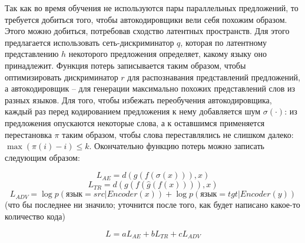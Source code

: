 \documentclass[12pt,twoside]{article}
\begin{document}
Так как во время обучения не используются пары параллельных предложений, то требуется добиться того, чтобы автокодировщики вели себя похожим образом. Этого можно добиться, потребовав сходство латентных пространств. Для этого предлагается использовать сеть-дискриминатор $q$, которая по латентному представлению $h$ некоторого предложения определяет, какому языку оно принадлежит. Функция потерь записывается таким образом, чтобы оптимизировать дискриминатор $r$ для распознавания представлений предложений, а автокодировщик -- для генерации максимально похожих представлений слов из разных языков. Для того, чтобы избежать переобучения автокодировщика, каждый раз перед кодированием предложения к нему добавляется шум $\sigma(\cdot)$: из предложения опускаются некоторые слова, а к оставшимся применяется перестановка $\pi$ таким образом, чтобы слова переставлялись не слишком далеко: $\max (\pi(i)-i) \le k$. Окончательно функцию потерь можно записать следующим образом:

\[ L_{AE} = d(g(f(\sigma(x))), x) \]
\[ L_{TR} = d(g(f(\widehat{g}(f(x)))), x) \]
\[ L_{ADV} = \log p(\text{язык} = src | Encoder(x)) + \log p(\text{язык} = tgt | Encoder(y)) \] (что бы последнее ни значило; уточнится после того, как будет написано какое-то количество кода)

\[ L = aL_{AE} + bL_{TR} + cL_{ADV} \]



\end{document}
